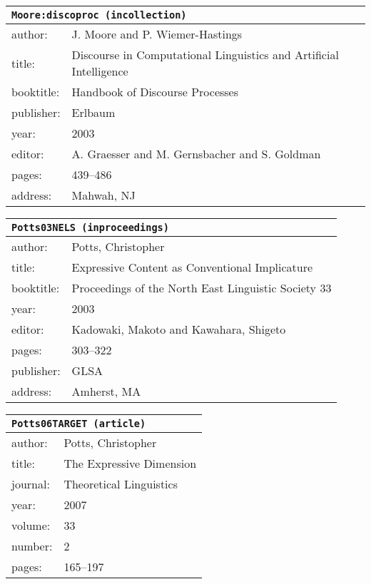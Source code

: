 \documentclass{article}
\begin{document}
\bigskip

\begin{tabular}{p{}p{}}
\multicolumn{2}{l}{\texttt{Moore:discoproc (incollection)}}\\
\hline
author: & J. Moore and P. Wiemer-Hastings\\
title: & Discourse in Computational Linguistics and Artificial Intelligence\\
booktitle: & Handbook of Discourse Processes\\
publisher: & Erlbaum\\
year: & 2003\\
editor: & A. Graesser and M. Gernsbacher and S. Goldman\\
pages: & 439--486\\
address: & Mahwah, NJ\\
\end{tabular}

\bigskip

\begin{tabular}{p{}p{}}
\multicolumn{2}{l}{\texttt{Potts03NELS (inproceedings)}}\\
\hline
author: & Potts, Christopher\\
title: & Expressive Content as Conventional Implicature\\
booktitle: & Proceedings of the {N}orth {E}ast {L}inguistic {S}ociety 33\\
year: & 2003\\
editor: & Kadowaki, Makoto and Kawahara, Shigeto\\
pages: & 303--322\\
publisher: & GLSA\\
address: & Amherst, MA\\
\end{tabular}

\bigskip

\begin{tabular}{p{}p{}}
\multicolumn{2}{l}{\texttt{Potts06TARGET (article)}}\\
\hline
author: & Potts, Christopher\\
title: & The Expressive Dimension\\
journal: & Theoretical Linguistics\\
year: & 2007\\
volume: & 33\\
number: & 2\\
pages: & 165--197\\
\end{tabular}
\end{document}
